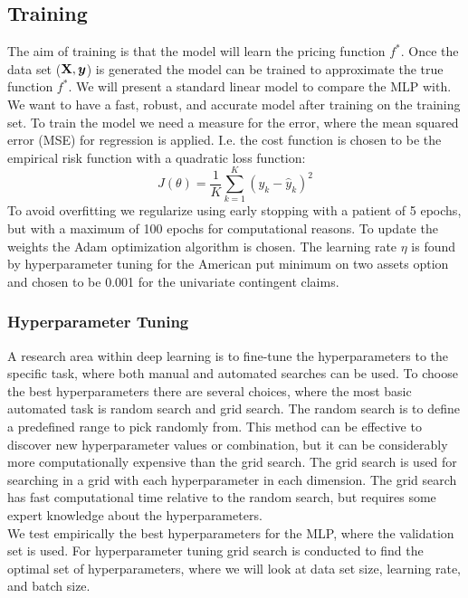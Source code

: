 \subsection{Training}\label{Training}
The aim of training is that the model will learn the pricing function $f^*$. Once the data set ($\mathbf{X}, \bm{y}$) is generated the model can be trained to approximate the true function $f^*$. We will present a standard linear model to compare the MLP with. We want to have a fast, robust, and accurate model after training on the training set. To train the model we need a measure for the error, where the mean squared error (MSE) for regression is applied. I.e. the cost function is chosen to be the empirical risk function with a quadratic loss function:
$$J(\theta)= \frac{1}{K} \sum_{k=1}^{K}(y_k-\hat{y}_k)^2$$
To avoid overfitting we regularize using early stopping with a patient of 5 epochs, but with a maximum of 100 epochs for computational reasons. To update the weights the Adam optimization algorithm is chosen.  The learning rate $\eta$ is found by hyperparameter tuning for the American put minimum on two assets option and chosen to be 0.001 for the univariate contingent claims.\\

\subsubsection{Hyperparameter Tuning}
A research area within deep learning is to fine-tune the hyperparameters to the specific task, where both manual and automated searches can be used. To choose the best hyperparameters there are several choices, where the most basic automated task is random search and grid search. The random search is to define a predefined range to pick randomly from. This method can be effective to discover new hyperparameter values or combination, but it can be considerably more computationally expensive than the grid search. The grid search is used for searching in a grid with each hyperparameter in each dimension. The grid search has fast computational time relative to the random search, but requires some expert knowledge about the hyperparameters.\\

We test empirically the best hyperparameters for the MLP, where the validation set is used. For hyperparameter tuning grid search is conducted to find the optimal set of hyperparameters, where we will look at data set size, learning rate, and batch size. \\

